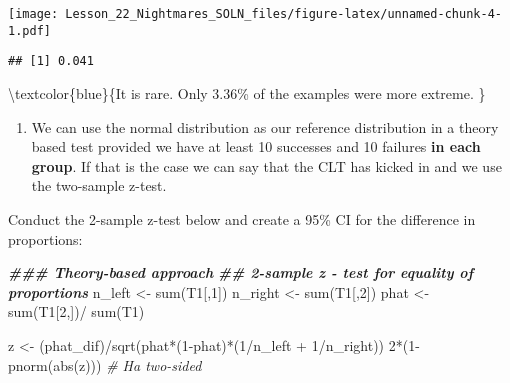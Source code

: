 \documentclass[
]{article}
\newenvironment{Shaded}{\begin{snugshade}}{\end{snugshade}}
\newcommand{\CommentTok}[1]{\textcolor[rgb]{0.56,0.35,0.01}{\textit{#1}}}
\newcommand{\DecValTok}[1]{\textcolor[rgb]{0.00,0.00,0.81}{#1}}
\newcommand{\DocumentationTok}[1]{\textcolor[rgb]{0.56,0.35,0.01}{\textbf{\textit{#1}}}}
\newcommand{\FunctionTok}[1]{\textcolor[rgb]{0.00,0.00,0.00}{#1}}
\newcommand{\NormalTok}[1]{#1}
\newcommand{\OtherTok}[1]{\textcolor[rgb]{0.56,0.35,0.01}{#1}}
\newcommand{\SpecialCharTok}[1]{\textcolor[rgb]{0.00,0.00,0.00}{#1}}
\providecommand{\tightlist}{%
  \setlength{\itemsep}{0pt}\setlength{\parskip}{0pt}}
\begin{document}
\texttt{[image: Lesson\_22\_Nightmares\_SOLN\_files/figure-latex/unnamed-chunk-4-1.pdf]}

\begin{Shaded}
\end{Shaded}

\begin{verbatim}
## [1] 0.041
\end{verbatim}

\textbackslash textcolor\{blue\}\{It is rare. Only 3.36\% of the
examples were more extreme. \}

\vspace{0.25in}

\begin{enumerate}
\def\labelenumi{(\arabic{enumi})}
\setcounter{enumi}{7}
\tightlist
\item
  We can use the normal distribution as our reference distribution in a
  theory based test provided we have at least 10 successes and 10
  failures \textbf{in each group}. If that is the case we can say that
  the CLT has kicked in and we use the two-sample z-test.
\end{enumerate}

Conduct the 2-sample z-test below and create a 95\% CI for the
difference in proportions:

\begin{Shaded}
\begin{Highlighting}[]
\DocumentationTok{\#\#\# Theory{-}based approach}
\DocumentationTok{\#\# 2{-}sample z {-} test for equality of proportions}
\NormalTok{n\_left }\OtherTok{\textless{}{-}} \FunctionTok{sum}\NormalTok{(T1[,}\DecValTok{1}\NormalTok{]) }
\NormalTok{n\_right }\OtherTok{\textless{}{-}} \FunctionTok{sum}\NormalTok{(T1[,}\DecValTok{2}\NormalTok{]) }
\NormalTok{phat }\OtherTok{\textless{}{-}} \FunctionTok{sum}\NormalTok{(T1[}\DecValTok{2}\NormalTok{,])}\SpecialCharTok{/} \FunctionTok{sum}\NormalTok{(T1)}

\NormalTok{z }\OtherTok{\textless{}{-}}\NormalTok{ (phat\_dif)}\SpecialCharTok{/}\FunctionTok{sqrt}\NormalTok{(phat}\SpecialCharTok{*}\NormalTok{(}\DecValTok{1}\SpecialCharTok{{-}}\NormalTok{phat)}\SpecialCharTok{*}\NormalTok{(}\DecValTok{1}\SpecialCharTok{/}\NormalTok{n\_left }\SpecialCharTok{+} \DecValTok{1}\SpecialCharTok{/}\NormalTok{n\_right))}
\DecValTok{2}\SpecialCharTok{*}\NormalTok{(}\DecValTok{1}\SpecialCharTok{{-}}\FunctionTok{pnorm}\NormalTok{(}\FunctionTok{abs}\NormalTok{(z)))                 }\CommentTok{\# Ha two{-}sided}
\end{Highlighting}
\end{Shaded}
\end{document}

